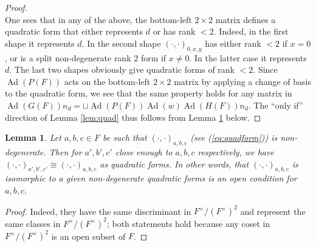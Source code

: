 \documentclass[11pt]{amsart}
\newtheorem{lemma}[theorem]{Lemma}
\theoremstyle{remark}
\newcommand{\Ad}{\operatorname{Ad}}
\begin{document}
\begin{proof}
\[	\]
	One sees that in any of the above, the bottom-left $2\times 2$ matrix defines a quadratic form that either represents $d$ or has rank $<2$. Indeed, in the first shape it represents $d$. In the second shape $(\cdot,\cdot)_{0,x,y}$ has either rank $<2$ if $x=0$, or is a split non-degenerate rank $2$ form if $x\not=0$. In the latter case it represents $d$. The last two shapes obviously give quadratic forms of rank $<2$. Since $\Ad(P(F))$ acts on the bottom-left $2\times 2$ matrix by applying a change of basis to the quadratic form, we see that the same property holds for any matrix in $\Ad(G(F))n_d=\sqcup \Ad(P(F))\Ad(w)\Ad(H(F))n_d$. The ``only if'' direction of Lemma \ref{lem:quad} thus follows from Lemma \ref{open} below.
\end{proof}

\begin{lemma}\label{open} Let $a,b,c\in F$ be such that $(\cdot,\cdot)_{a,b,c}$ (see (\ref{eq:quadform})) is non-degenerate. Then for $a',b',c'$ close enough to $a,b,c$ respectively, we have $(\cdot,\cdot)_{a',b',c'}\cong(\cdot,\cdot)_{a,b,c}$ as quadratic forms. In other words, that $(\cdot,\cdot)_{a,b,c}$ is isomorphic to a given non-degenerate quadratic forms is an open condition for $a,b,c$.
\end{lemma}

\begin{proof} Indeed, they have the same discriminant in $F^{\times}/(F^{\times})^2$ and represent the same classes in $F^{\times}/(F^{\times})^2$; both statements hold because any coset in $F^{\times}/(F^{\times})^2$ is an open subset of $F$.
\end{proof}
\fi
\end{document}
